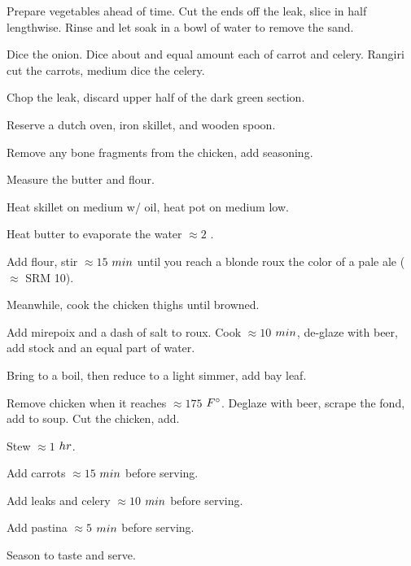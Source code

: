 \begin{preparation}
\item Prepare vegetables ahead of time.
	Cut the ends off the leak, slice in half lengthwise.
	Rinse and let soak in a bowl of water to remove the sand.

\item Dice the onion.
	Dice about and equal amount each of carrot and celery.
	Rangiri cut the carrots, medium dice the celery.

\item Chop the leak, discard upper half of the dark green section.


\item Reserve a dutch oven, iron skillet, and wooden spoon.

\item Remove any bone fragments from the chicken, add seasoning.

\item Measure the butter and flour.

\item Heat skillet on medium w/ oil, heat pot on medium low.

\item Heat butter to evaporate the water $\approx2$ \minute.

\item Add flour, stir $\approx 15$ $\minute$ until you reach a blonde roux the color of a pale ale ($\approx$ SRM 10).

\item Meanwhile, cook the chicken thighs until browned.

\item Add mirepoix and a dash of salt to roux.
	Cook $\approx 10$ $\minute$, de-glaze with beer, add stock and an equal part of water.

\item Bring to a boil, then reduce to a light simmer, add bay leaf.

\item Remove chicken when it reaches $\approx 175$ $\Fahrenheit$.
	Deglaze with beer, scrape the fond, add to soup.
	Cut the chicken, add.

\item Stew $\approx 1$ $\hour$.

\item Add carrots $\approx 15$ $\minute$ before serving.

\item Add leaks and celery $\approx 10$ $\minute$ before serving.

\item Add pastina $\approx 5$ $\minute$ before serving.

\item Season to taste and serve.
\end{preparation}


\recipeend%
